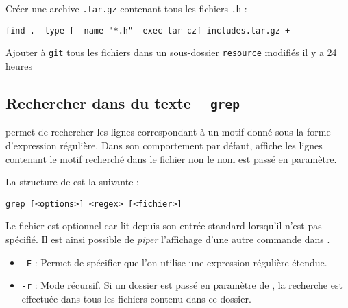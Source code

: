 Créer une archive \texttt{.tar.gz} contenant tous les fichiers \texttt{.h} :
\begin{nscenter}
\texttt{find . -type f -name "*.h" -exec tar czf includes.tar.gz {} +}
\end{nscenter}

Ajouter à \texttt{git} tous les fichiers dans un sous-dossier \texttt{resource} modifiés il y a 24 heures

\newpage
\subsection{Rechercher dans du texte -- \texttt{grep}} 
 permet de rechercher les lignes correspondant à un motif donné sous la forme d'expression régulière. Dans son comportement par défaut,  affiche les lignes contenant le motif recherché dans le fichier non le nom est passé en paramètre.

La structure de  est la suivante : 
\begin{nscenter}
\texttt{grep [<options>] <regex> [<fichier>]}
\end{nscenter}
Le fichier est optionnel car  lit depuis son entrée standard lorsqu'il n'est pas spécifié. Il est ainsi possible de \textit{piper} l'affichage d'une autre commande dans .

\begin{itemize}
    \item \texttt{-E} : Permet de spécifier que l'on utilise une expression régulière étendue.
    \item \texttt{-r} : Mode récursif. Si un dossier est passé en paramètre de , la recherche est effectuée dans tous les fichiers contenu dans ce dossier.
\end{itemize}

